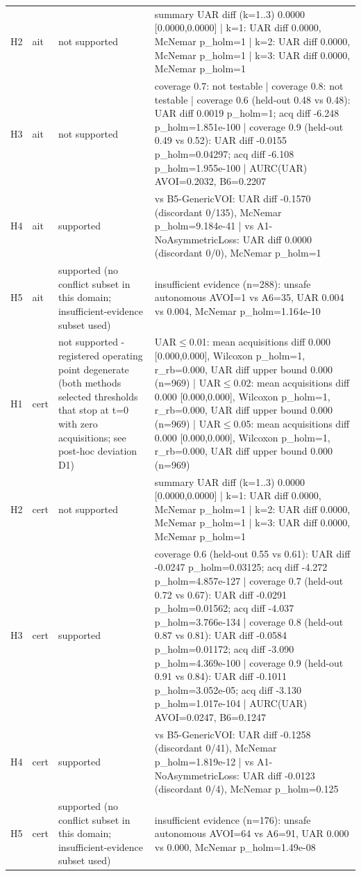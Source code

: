 \begin{table}[!ht]
{\begin{tabular}{llll}
H2 & ait & not supported & summary UAR diff (k=1..3) 0.0000 [0.0000,0.0000] | k=1: UAR diff 0.0000, McNemar p\_holm=1 | k=2: UAR diff 0.0000, McNemar p\_holm=1 | k=3: UAR diff 0.0000, McNemar p\_holm=1 \\
H3 & ait & not supported & coverage 0.7: not testable | coverage 0.8: not testable | coverage 0.6 (held-out 0.48 vs 0.48): UAR diff 0.0019 p\_holm=1; acq diff -6.248 p\_holm=1.851e-100 | coverage 0.9 (held-out 0.49 vs 0.52): UAR diff -0.0155 p\_holm=0.04297; acq diff -6.108 p\_holm=1.955e-100 | AURC(UAR) AVOI=0.2032, B6=0.2207 \\
H4 & ait & supported & vs B5-GenericVOI: UAR diff -0.1570 (discordant 0/135), McNemar p\_holm=9.184e-41 | vs A1-NoAsymmetricLoss: UAR diff 0.0000 (discordant 0/0), McNemar p\_holm=1 \\
H5 & ait & supported (no conflict subset in this domain; insufficient-evidence subset used) & insufficient evidence (n=288): unsafe autonomous AVOI=1 vs A6=35, UAR 0.004 vs 0.004, McNemar p\_holm=1.164e-10 \\
H1 & cert & not supported - registered operating point degenerate (both methods selected thresholds that stop at t=0 with zero acquisitions; see post-hoc deviation D1) & UAR$\le$0.01: mean acquisitions diff 0.000 [0.000,0.000], Wilcoxon p\_holm=1, r\_rb=0.000, UAR diff upper bound 0.000 (n=969) | UAR$\le$0.02: mean acquisitions diff 0.000 [0.000,0.000], Wilcoxon p\_holm=1, r\_rb=0.000, UAR diff upper bound 0.000 (n=969) | UAR$\le$0.05: mean acquisitions diff 0.000 [0.000,0.000], Wilcoxon p\_holm=1, r\_rb=0.000, UAR diff upper bound 0.000 (n=969) \\
H2 & cert & not supported & summary UAR diff (k=1..3) 0.0000 [0.0000,0.0000] | k=1: UAR diff 0.0000, McNemar p\_holm=1 | k=2: UAR diff 0.0000, McNemar p\_holm=1 | k=3: UAR diff 0.0000, McNemar p\_holm=1 \\
H3 & cert & supported & coverage 0.6 (held-out 0.55 vs 0.61): UAR diff -0.0247 p\_holm=0.03125; acq diff -4.272 p\_holm=4.857e-127 | coverage 0.7 (held-out 0.72 vs 0.67): UAR diff -0.0291 p\_holm=0.01562; acq diff -4.037 p\_holm=3.766e-134 | coverage 0.8 (held-out 0.87 vs 0.81): UAR diff -0.0584 p\_holm=0.01172; acq diff -3.090 p\_holm=4.369e-100 | coverage 0.9 (held-out 0.91 vs 0.84): UAR diff -0.1011 p\_holm=3.052e-05; acq diff -3.130 p\_holm=1.017e-104 | AURC(UAR) AVOI=0.0247, B6=0.1247 \\
H4 & cert & supported & vs B5-GenericVOI: UAR diff -0.1258 (discordant 0/41), McNemar p\_holm=1.819e-12 | vs A1-NoAsymmetricLoss: UAR diff -0.0123 (discordant 0/4), McNemar p\_holm=0.125 \\
H5 & cert & supported (no conflict subset in this domain; insufficient-evidence subset used) & insufficient evidence (n=176): unsafe autonomous AVOI=64 vs A6=91, UAR 0.000 vs 0.000, McNemar p\_holm=1.49e-08 \\
\bottomrule
\end{tabular}}
\end{table}
